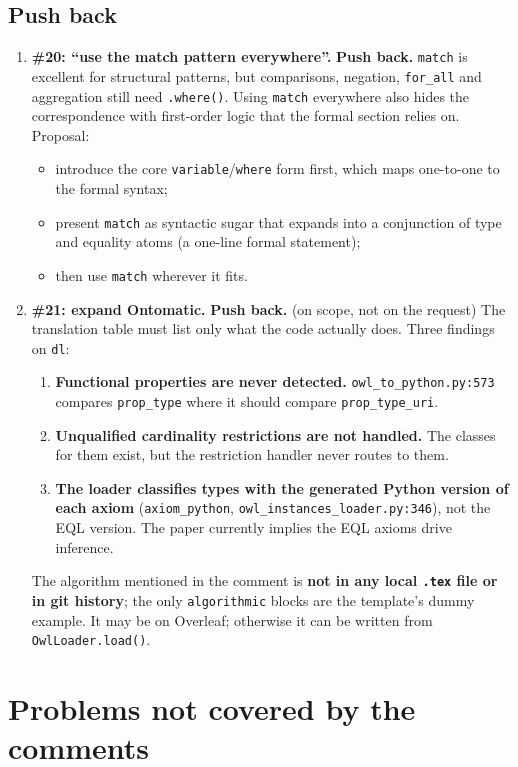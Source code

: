\documentclass[11pt]{article}
\newcommand{\code}[1]{\texttt{#1}}
\newcommand{\pushback}{\textcolor{warn}{\textbf{Push back.}}}
\begin{document}
\subsection{Push back}
\begin{enumerate}[label=\textbf{3.\arabic*},resume]
  \item \textbf{\#20: ``use the match pattern everywhere''.} \pushback{} \code{match} is excellent for structural patterns, but comparisons, negation, \code{for\_all} and aggregation still need \code{.where()}. Using \code{match} everywhere also hides the correspondence with first-order logic that the formal section relies on. Proposal:
  \begin{itemize}
    \item introduce the core \code{variable}/\code{where} form first, which maps one-to-one to the formal syntax;
    \item present \code{match} as syntactic sugar that expands into a conjunction of type and equality atoms (a one-line formal statement);
    \item then use \code{match} wherever it fits.
  \end{itemize}
  \item \textbf{\#21: expand Ontomatic.} \pushback{} (on scope, not on the request) The translation table must list only what the code actually does. Three findings on \code{dl}:
  \begin{enumerate}[label=(\alph*)]
    \item \textbf{Functional properties are never detected.} \code{owl\_to\_python.py:573} compares \code{prop\_type} where it should compare \code{prop\_type\_uri}.
    \item \textbf{Unqualified cardinality restrictions are not handled.} The classes for them exist, but the restriction handler never routes to them.
    \item \textbf{The loader classifies types with the generated Python version of each axiom} (\code{axiom\_python}, \code{owl\_instances\_loader.py:346}), not the EQL version. The paper currently implies the EQL axioms drive inference.
  \end{enumerate}
  The algorithm mentioned in the comment is \textbf{not in any local \code{.tex} file or in git history}; the only \code{algorithmic} blocks are the template's dummy example. It may be on Overleaf; otherwise it can be written from \code{OwlLoader.load()}.
\end{enumerate}

\section{Problems not covered by the comments}
\end{document}
